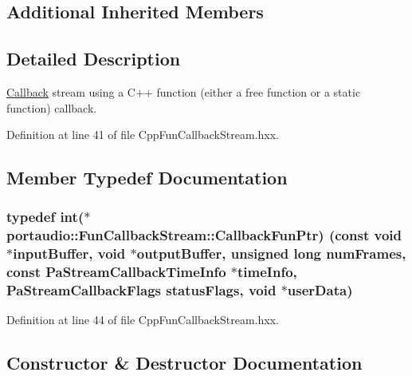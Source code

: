 \subsection*{Additional Inherited Members}


\subsection{Detailed Description}
\hyperlink{class_callback}{Callback} stream using a C++ function (either a free function or a static function) callback. 

Definition at line 41 of file Cpp\+Fun\+Callback\+Stream.\+hxx.



\subsection{Member Typedef Documentation}
\subsubsection[{\texorpdfstring{Callback\+Fun\+Ptr}{CallbackFunPtr}}]{\setlength{\rightskip}{0pt plus 5cm}typedef {\bf int}($\ast$ portaudio\+::\+Fun\+Callback\+Stream\+::\+Callback\+Fun\+Ptr) ({\bf const} {\bf void} $\ast$input\+Buffer, {\bf void} $\ast$output\+Buffer, unsigned long num\+Frames, {\bf const} {\bf Pa\+Stream\+Callback\+Time\+Info} $\ast$time\+Info, {\bf Pa\+Stream\+Callback\+Flags} status\+Flags, {\bf void} $\ast${\bf user\+Data})}\hypertarget{classportaudio_1_1_fun_callback_stream_abad4a65493bda517c7df8d7cee847784}{}\label{classportaudio_1_1_fun_callback_stream_abad4a65493bda517c7df8d7cee847784}


Definition at line 44 of file Cpp\+Fun\+Callback\+Stream.\+hxx.



\subsection{Constructor \& Destructor Documentation}
